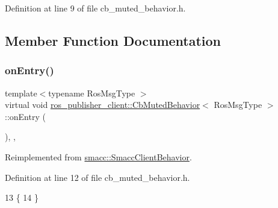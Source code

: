 Definition at line 9 of file cb\+\_\+muted\+\_\+behavior.\+h.



\subsection{Member Function Documentation}
\mbox{\label{classros__publisher__client_1_1CbMutedBehavior_a080b2db7ff4aa25463423e4b0a8ee572}} 
\subsubsection{\texorpdfstring{on\+Entry()}{onEntry()}}
{\footnotesize\ttfamily template$<$typename Ros\+Msg\+Type $>$ \\
virtual void \hyperlink{classros__publisher__client_1_1CbMutedBehavior}{ros\+\_\+publisher\+\_\+client\+::\+Cb\+Muted\+Behavior}$<$ Ros\+Msg\+Type $>$\+::on\+Entry (\begin{DoxyParamCaption}{ }\end{DoxyParamCaption})\hspace{0.3cm}{\ttfamily [inline]}, {\ttfamily [override]}, {\ttfamily [virtual]}}



Reimplemented from \hyperlink{classsmacc_1_1SmaccClientBehavior_a7962382f93987c720ad432fef55b123f}{smacc\+::\+Smacc\+Client\+Behavior}.



Definition at line 12 of file cb\+\_\+muted\+\_\+behavior.\+h.


\begin{DoxyCode}
13     \{
14     \}
\end{DoxyCode}
\mbox{\label{classros__publisher__client_1_1CbMutedBehavior_aad2c833afdc6f5d81f3ddce3c0f767e3}} 
